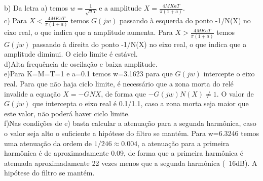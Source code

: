 b) Da letra a) temos $w=\frac{1}{\sqrt{a}T}$ e a amplitude $X=\frac{4MKaT}{\pi(1+a)}$.\\

c) Para $X<\frac{4MKaT}{\pi(1+a)}$ temos $G(jw)$ passando à esquerda do ponto -1/N(X) no eixo real, o que indica que a amplitude aumenta. Para $X>\frac{4MKaT}{\pi(1+a)}$ temos $G(jw)$ passando à direita do ponto -1/N(X) no eixo real, o que indica que a amplitude diminui. O ciclo limite é estável.\\

d)Alta frequência de oscilação e baixa amplitude.\\

e)Para K=M=T=1 e a=0.1 temos w=3.1623 para que $G(jw)$ intercepte o eixo real. Para que não haja ciclo limite, é necessário que a zona morta do relé invalide a equação $X=-GNX$, de forma que $-G(jw)N(X)\neq1$. O valor de $G(jw)$ que intercepta o eixo real é 0.1/1.1, caso a zona morta seja maior que este valor, não poderá haver ciclo limite.\\

f)Nas condições de e) basta calcular a atenuação para a segunda harmônica, caso o valor seja alto o suficiente a hipótese do filtro se mantém. Para w=6.3246 temos uma atenuação da ordem de $1/246 \approx 0.004$, a atenuação para a primeira harmônica é de aproximadamente 0.09, de forma que a primeira harmônica é atenuada aproximadamente 22 vezes menos que a segunda harmônica (~16dB). A hipótese do filtro se mantém.